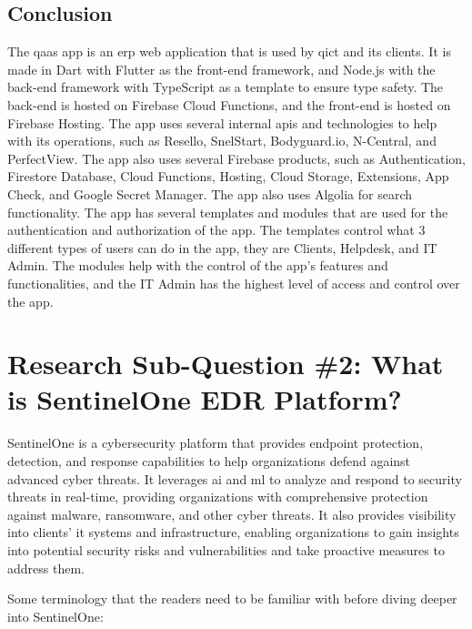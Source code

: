 \begin{multicols}{2}
      \subsection{Conclusion}
      The \acrshort{qaas} app is an \acrshort{erp} web application that is used by \acrshort{qict} and its clients.
      It is made in Dart with Flutter as the front-end framework, and Node.js with the back-end  framework with
      TypeScript as a template to ensure type safety. The back-end is hosted on Firebase Cloud Functions, and the
      front-end is hosted on Firebase Hosting. The app uses several internal \acrshort{api}s and technologies to
      help with its operations, such as Resello, SnelStart, Bodyguard.io, N-Central, and PerfectView. The app also
      uses several Firebase products, such as Authentication, Firestore Database, Cloud Functions, Hosting, Cloud
      Storage, Extensions, App Check, and Google Secret Manager. The app also uses Algolia for search functionality. The app
      has several templates and modules that are used for the authentication and authorization of the app.
      The templates control what 3 different types of users can do in the app, they are Clients, Helpdesk, and IT
      Admin. The modules help with the control of the app's features and functionalities, and the IT Admin has the
      highest level of access and control over the app.

      \section{Research Sub-Question \#2: What is SentinelOne EDR Platform?}

      SentinelOne is a cybersecurity platform that provides endpoint protection, detection, and response capabilities to
      help organizations defend against advanced cyber threats. It leverages \acrshort{ai} and \acrshort{ml} to analyze
      and respond to security threats in real-time, providing organizations with comprehensive protection against malware,
      ransomware, and other cyber threats. It also provides visibility into clients' \acrshort{it} systems and infrastructure,
      enabling organizations to gain insights into potential security risks and vulnerabilities and take proactive measures
      to address them.

      Some terminology that the readers need to be familiar with before diving deeper into SentinelOne:


\end{multicols}
